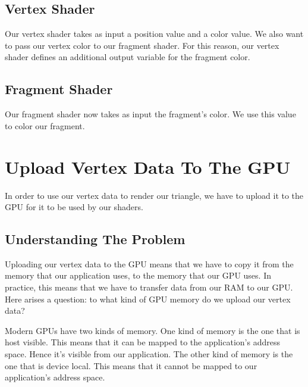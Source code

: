 \subsection{Vertex Shader}

Our vertex shader takes as input a position value and a color value.
We also want to pass our vertex color to our fragment shader.
For this reason, our vertex shader defines an additional output variable for
the fragment color.

\begin{minipage}{\linewidth}{\noindent}
    
\end{minipage}

\subsection{Fragment Shader}

Our fragment shader now takes as input the fragment's color.
We use this value to color our fragment.

\begin{minipage}{\linewidth}{\noindent}
    
\end{minipage}

\section{Upload Vertex Data To The GPU}

In order to use our vertex data to render our triangle, we have to upload it
to the GPU for it to be used by our shaders.

\subsection{Understanding The Problem}

Uploading our vertex data to the GPU means that we have to copy it
from the memory that our application uses, to the memory that our GPU uses.
In practice, this means that we have to transfer data from our RAM to our GPU.
Here arises a question: to what kind of GPU memory do we upload
our vertex data?

Modern GPUs have two kinds of memory.
One kind of memory is the one that is host visible.
This means that it can be mapped to the application's address space.
Hence it's visible from our application.
The other kind of memory is the one that is device local.
This means that it cannot be mapped to our application's address space.

